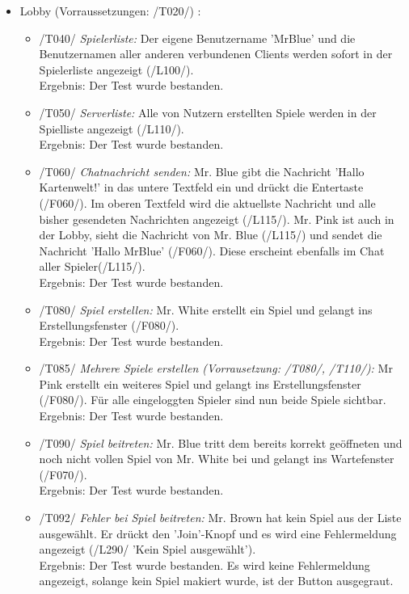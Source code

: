 \documentclass[a4paper]{article}
\begin{document}
\begin{itemize}
\begin{itemize}
	\end{itemize}
	\item Lobby (Vorraussetzungen: /T020/) :
	\begin{itemize}
	
		\item /T040/ \textit{Spielerliste:} Der eigene Benutzername 'MrBlue' und die Benutzernamen aller anderen 					verbundenen Clients werden sofort in der Spielerliste angezeigt (/L100/). \\
		Ergebnis: Der Test wurde bestanden.
		
		\item /T050/ \textit{Serverliste:} Alle von Nutzern erstellten Spiele werden in der Spielliste angezeigt (/L110/). 			\\
		Ergebnis: Der Test wurde bestanden.
		
		\item /T060/ \textit{Chatnachricht senden:} Mr. Blue gibt die Nachricht 'Hallo Kartenwelt!' in das untere Textfeld ein 			und drückt die Entertaste (/F060/). Im oberen Textfeld wird die aktuellste Nachricht und alle bisher gesendeten 				Nachrichten angezeigt (/L115/). Mr. Pink ist auch in der Lobby, sieht die Nachricht von Mr. Blue (/L115/) und 				sendet die Nachricht 'Hallo MrBlue' (/F060/). Diese erscheint ebenfalls im Chat aller Spieler(/L115/). \\
		Ergebnis: Der Test wurde bestanden.
		
		\item /T080/ \textit{Spiel erstellen:} Mr. White erstellt ein Spiel und gelangt ins Erstellungsfenster (/F080/). \\
		Ergebnis: Der Test wurde bestanden.
		
		\item /T085/ \textit{Mehrere Spiele erstellen (Vorrausetzung: /T080/, /T110/):} Mr Pink erstellt ein weiteres Spiel 				und gelangt ins Erstellungsfenster (/F080/). Für alle eingeloggten Spieler sind nun beide Spiele sichtbar. \\
		Ergebnis: Der Test wurde bestanden.
		
		\item /T090/ \textit{Spiel beitreten:} Mr. Blue tritt dem bereits korrekt geöffneten und noch nicht vollen Spiel von Mr. 		White bei und gelangt ins Wartefenster (/F070/). \\
		Ergebnis: Der Test wurde bestanden. 
		
		\item /T092/ \textit{Fehler bei Spiel beitreten:} Mr. Brown hat kein Spiel aus der Liste ausgewählt. Er drückt den 				'Join'-Knopf und es wird eine Fehlermeldung angezeigt (/L290/ 'Kein Spiel ausgewählt'). \\
		Ergebnis: Der Test wurde bestanden. Es wird keine Fehlermeldung angezeigt, solange kein Spiel makiert wurde, ist 			der Button ausgegraut.
		

\end{itemize}
\end{itemize}
\end{document}

